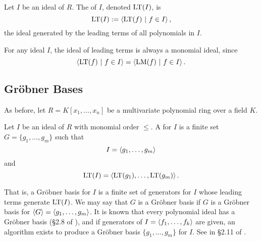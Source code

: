 \begin{definition}
  Let $I$ be an ideal of $R$.
  The  of $I$, denoted $\operatorname{LT}(I)$, is
  \begin{equation*}
    \operatorname{LT}(I) := \left\langle  \operatorname{LT}(f) ~|~ f \in I  \right\rangle,
  \end{equation*}
  the ideal generated by the leading terms of all polynomials in $I$.
\end{definition}
For any ideal $I$, the ideal of leading terms is always a monomial ideal, since
\[ \left\langle  \operatorname{LT}(f) ~|~ f \in I  \right\rangle = \left\langle  \operatorname{LM}(f) ~|~ f \in I  \right\rangle. \]




\subsection{Gr\"obner Bases} \label{sec:groebner_bases}

As before, let $R = K[x_1, \ldots, x_n]$ be a multivariate polynomial ring over a field $K$.

\begin{definition}
  \label{def_groebner_basis}
  Let $I$ be an ideal of $R$ with monomial order $\leq$.
  A  for $I$ is a finite set $G = \{ g_1, \ldots, g_m \}$ such that
    \[ I = \left\langle  g_1, \ldots, g_m  \right\rangle \]
  and
    \[ \operatorname{LT}(I) = \left\langle  \operatorname{LT}(g_1), \ldots, \operatorname{LT}(g_m)  \right\rangle. \]
\end{definition}
That is, a Gr\"obner basis for $I$ is a finite set of generators for $I$ whose leading terms generate $\operatorname{LT}(I)$.
We may say that $G$ is a Gr\"obner basis if $G$ is a Gr\"obner basis for $\left\langle G \right\rangle = \left\langle g_1, \ldots, g_m \right\rangle$.
It is known that every polynomial ideal has a Gr\"obner basis (\S 2.8 of \cite{buchberger98}),
and if generators of $I = \left\langle f_1, \ldots, f_k \right\rangle$ are given,
an algorithm exists to produce a Gr\"obner basis $\{g_1, \ldots, g_m\}$ for $I$.
See  in \S 2.11 of \cite{buchberger98}.

